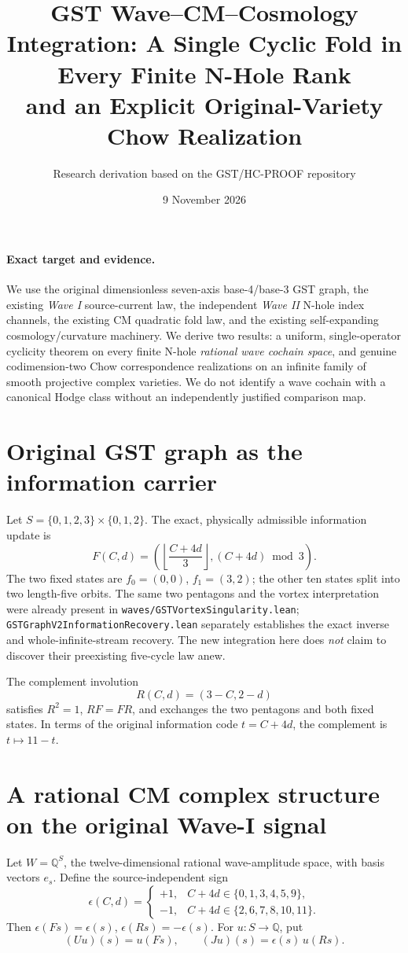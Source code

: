 \documentclass[11pt]{article}
\title{GST Wave--CM--Cosmology Integration:
A Single Cyclic Fold in Every Finite N-Hole Rank\\
and an Explicit Original-Variety Chow Realization}
\author{Research derivation based on the GST/HC-PROOF repository}
\date{9 November 2026}
\newcommand{\QQ}{\mathbb Q}
\begin{document}
\maketitle

\paragraph{Exact target and evidence.}
We use the original dimensionless seven-axis base-4/base-3 GST graph, the existing \emph{Wave I} source-current law, the independent \emph{Wave II} N-hole index channels, the existing CM quadratic fold law, and the existing self-expanding cosmology/curvature machinery. We derive two results: a uniform, single-operator cyclicity theorem on every finite N-hole \emph{rational wave cochain space}, and genuine codimension-two Chow correspondence realizations on an infinite family of smooth projective complex varieties. We do not identify a wave cochain with a canonical Hodge class without an independently justified comparison map.

\section{Original GST graph as the information carrier}

Let \(S=\{0,1,2,3\}\times\{0,1,2\}\). The exact, physically admissible information update is
\[
 F(C,d)=\left(\left\lfloor\frac{C+4d}{3}\right\rfloor,(C+4d)\bmod3\right).
\]
The two fixed states are \(f_0=(0,0)\), \(f_1=(3,2)\); the other ten states split into two length-five orbits. The same two pentagons and the vortex interpretation were already present in
\texttt{waves/GSTVortexSingularity.lean}; \texttt{GSTGraphV2InformationRecovery.lean} separately establishes the exact inverse and whole-infinite-stream recovery. The new integration here does \emph{not} claim to discover their preexisting five-cycle law anew.

The complement involution
\[
 R(C,d)=(3-C,2-d)
\]
satisfies \(R^2=1\), \(RF=FR\), and exchanges the two pentagons and both fixed states. In terms of the original information code \(t=C+4d\), the complement is \(t\mapsto11-t\).

\section{A rational CM complex structure on the original Wave-I signal}

Let \(W=\QQ^S\), the twelve-dimensional rational wave-amplitude space, with basis vectors \(e_s\). Define the source-independent sign
\[
 \epsilon(C,d)=
 \begin{cases}
 +1,&C+4d\in\{0,1,3,4,5,9\},\\
 -1,&C+4d\in\{2,6,7,8,10,11\}.
 \end{cases}
\]
Then \(\epsilon(Fs)=\epsilon(s)\), \(\epsilon(Rs)=-\epsilon(s)\).
For \(u:S\to\QQ\), put
\[
  (Uu)(s)=u(Fs),\qquad (Ju)(s)=\epsilon(s)\,u(Rs).
\]
\end{document}
